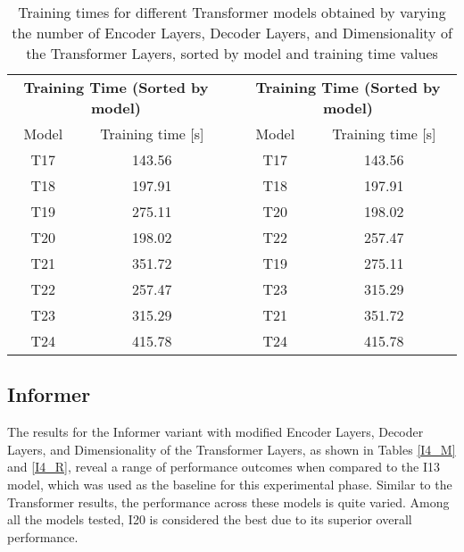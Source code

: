 \begin{table}[]
    \begin{tabular}{ccccc}
    \multicolumn{2}{c}{\textbf{Training   Time (Sorted by model)}} &  & \multicolumn{2}{c}{\textbf{Training Time (Sorted   by model)}} \\
    Model             & Training time {[}s{]}                      &  & Model             & Training time {[}s{]}                      \\
    T17               & \cellcolor[HTML]{63BE7B}143.56             &  & T17               & \cellcolor[HTML]{63BE7B}143.56             \\
    T18               & \cellcolor[HTML]{A8D17E}197.91             &  & T18               & \cellcolor[HTML]{A8D17E}197.91             \\
    T19               & \cellcolor[HTML]{FFE483}275.11             &  & T20               & \cellcolor[HTML]{A8D17E}198.02             \\
    T20               & \cellcolor[HTML]{A8D17E}198.02             &  & T22               & \cellcolor[HTML]{F3E783}257.47             \\
    T21               & \cellcolor[HTML]{FBA176}351.72             &  & T19               & \cellcolor[HTML]{FFE483}275.11             \\
    T22               & \cellcolor[HTML]{F3E783}257.47             &  & T23               & \cellcolor[HTML]{FDC17C}315.29             \\
    T23               & \cellcolor[HTML]{FDC17C}315.29             &  & T21               & \cellcolor[HTML]{FBA176}351.72             \\
    T24               & \cellcolor[HTML]{F8696B}415.78             &  & T24               & \cellcolor[HTML]{F8696B}415.78            
    \end{tabular}
    \caption{Training times for different Transformer models obtained by varying the number of Encoder Layers, Decoder Layers, and Dimensionality of the Transformer Layers, sorted by model and training time values}
    \label{T4_T}
    \end{table}


\subsection{Informer}
The results for the Informer variant with modified Encoder Layers, Decoder Layers, and Dimensionality of the Transformer Layers, as shown in Tables \ref{I4_M} and \ref{I4_R}, reveal a range of performance outcomes when compared to the I13 model, which was used as the baseline for this experimental phase. Similar to the Transformer results, the performance across these models is quite varied. Among all the models tested, I20 is considered the best due to its superior overall performance.

